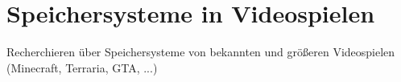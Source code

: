 \chapter{Speichersysteme in Videospielen}\label{ch:videospiele}

Recherchieren über Speichersysteme von bekannten und größeren Videospielen (Minecraft, Terraria, GTA, ...)
